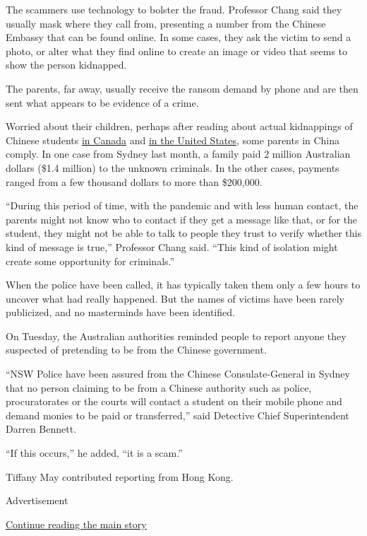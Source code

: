 The scammers use technology to bolster the fraud. Professor Chang said
they usually mask where they call from, presenting a number from the
Chinese Embassy that can be found online. In some cases, they ask the
victim to send a photo, or alter what they find online to create an
image or video that seems to show the person kidnapped.

The parents, far away, usually receive the ransom demand by phone and
are then sent what appears to be evidence of a crime.

Worried about their children, perhaps after reading about actual
kidnappings of Chinese students
\href{https://edition.cnn.com/2019/03/26/asia/canada-chinese-student-kidnap-intl/index.html}{in
Canada} and \href{https://www.bbc.com/news/world-us-canada-48749420}{in
the United States}, some parents in China comply. In one case from
Sydney last month, a family paid 2 million Australian dollars (\$1.4
million) to the unknown criminals. In the other cases, payments ranged
from a few thousand dollars to more than \$200,000.

``During this period of time, with the pandemic and with less human
contact, the parents might not know who to contact if they get a message
like that, or for the student, they might not be able to talk to people
they trust to verify whether this kind of message is true,'' Professor
Chang said. ``This kind of isolation might create some opportunity for
criminals.''

When the police have been called, it has typically taken them only a few
hours to uncover what had really happened. But the names of victims have
been rarely publicized, and no masterminds have been identified.

On Tuesday, the Australian authorities reminded people to report anyone
they suspected of pretending to be from the Chinese government.

``NSW Police have been assured from the Chinese Consulate-General in
Sydney that no person claiming to be from a Chinese authority such as
police, procuratorates or the courts will contact a student on their
mobile phone and demand monies to be paid or transferred,'' said
Detective Chief Superintendent Darren Bennett.

``If this occurs,'' he added, ``it is a scam.''

Tiffany May contributed reporting from Hong Kong.

Advertisement

\protect\hyperlink{after-bottom}{Continue reading the main story}

